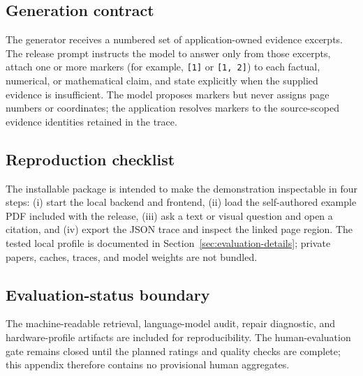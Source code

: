\subsection{Generation contract}
\label{app:generation-contract}

The generator receives a numbered set of application-owned evidence excerpts. The release prompt instructs the model to answer only from those excerpts, attach one or more markers (for example, \texttt{[1]} or \texttt{[1, 2]}) to each factual, numerical, or mathematical claim, and state explicitly when the supplied evidence is insufficient. The model proposes markers but never assigns page numbers or coordinates; the application resolves markers to the source-scoped evidence identities retained in the trace.

\subsection{Reproduction checklist}
\label{app:reproduction}

The installable package is intended to make the demonstration inspectable in four steps: (i) start the local backend and frontend, (ii) load the self-authored example PDF included with the release, (iii) ask a text or visual question and open a citation, and (iv) export the JSON trace and inspect the linked page region. The tested local profile is documented in Section~\ref{sec:evaluation-details}; private papers, caches, traces, and model weights are not bundled.

\subsection{Evaluation-status boundary}
\label{app:evaluation-boundary}

The machine-readable retrieval, language-model audit, repair diagnostic, and hardware-profile artifacts are included for reproducibility. The human-evaluation gate remains closed until the planned ratings and quality checks are complete; this appendix therefore contains no provisional human aggregates.
